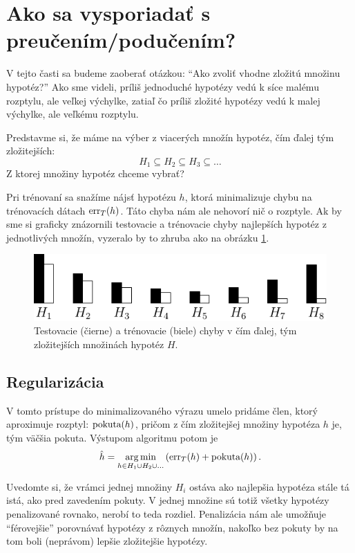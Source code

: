 \section{Ako sa vysporiadať s preučením/podučením?}

V tejto časti sa budeme zaoberať otázkou: ``Ako zvoliť vhodne zložitú
množinu hypotéz?'' Ako sme videli, príliš jednoduché hypotézy vedú
k síce malému rozptylu, ale veľkej výchylke, zatiaľ čo príliš zložité
hypotézy vedú k malej výchylke, ale veľkému rozptylu.

Predstavme si, že máme na výber z viacerých množín hypotéz, čím ďalej
tým zložitejších:
$$H_1 \subseteq H_2 \subseteq H_3 \subseteq \ldots$$
Z ktorej množiny hypotéz chceme vybrať?

Pri trénovaní sa snažíme nájsť hypotézu $h$, ktorá minimalizuje chybu
na trénovacích dátach $\mathrm{err}_T(h)$. Táto chyba nám ale nehovorí nič o rozptyle.
Ak by sme si graficky znázornili testovacie a trénovacie chyby najlepších
hypotéz z jednotlivých množín, vyzeralo by to zhruba ako na obrázku
\ref{img:multimodels}.

\begin{figure}
  \centering
  \includegraphics[scale=1]{obrazky/multimodels.pdf}
  \caption{Testovacie (čierne) a trénovacie (biele) chyby v čím ďalej,
    tým zložitejších množinách hypotéz $H$.}
  \label{img:multimodels}
\end{figure}



\subsection{Regularizácia}

V tomto prístupe do minimalizovaného výrazu umelo pridáme člen, ktorý
aproximuje rozptyl: $\text{\normalfont pokuta}(h)$, pričom z čím zložitejšej množiny
hypotéza $h$ je, tým väčšia pokuta. Výstupom algoritmu potom je
$$\hat{h} = \operatorname*{arg\,min}_{h \in H_1 \cup H_2 \cup \ldots} \left( \mathrm{err}_T(h) + \text{\normalfont pokuta}(h) \right).$$

Uvedomte si, že vrámci jednej množiny $H_i$ ostáva ako najlepšia
hypotéza stále tá istá, ako pred zavedením pokuty. V jednej množine
sú totiž všetky hypotézy penalizované rovnako, nerobí to teda rozdiel.
Penalizácia nám ale umožňuje ``férovejšie'' porovnávať hypotézy z rôznych
množín, nakoľko bez pokuty by na tom boli (neprávom) lepšie
zložitejšie hypotézy.

